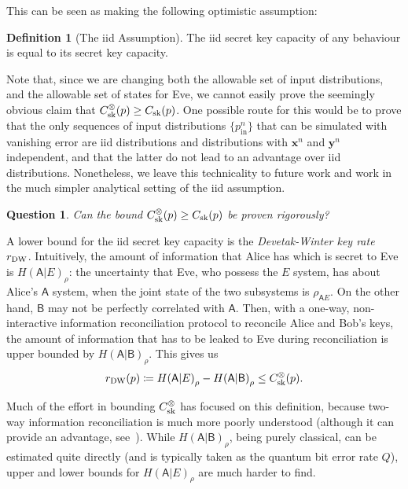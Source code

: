 \documentclass[10pt, a4paper]{article}
\numberwithin{equation}{section} %
\newcounter{stmt} %
\theoremstyle{definition}
\newtheorem{defn}[stmt]{Definition}
\theoremstyle{plain}
\newtheorem{question}{Question}
\newcommand{\?}{\mathrel{?}} %
\newcommand{\cvec}[1]{\boldsymbol{\mathbf{#1}}}    %
\newcommand{\crv}[1]{\mathsf{#1}}
\newcommand{\prin}[1][p]{#1_{\mathrm{in}}}
\newcommand{\sk}{\rm sk}
\newcommand{\DW}{\rm DW}
\begin{document}
    This can be seen as making the following optimistic assumption:
    \begin{defn}[The iid Assumption]
      The iid secret key capacity of any behaviour is equal to its secret key capacity.
    \end{defn}
    Note that, since we are changing both the allowable set of input distributions, and the allowable set of states for Eve, we cannot easily prove the seemingly obvious claim that \(C_{\sk}^{\otimes}(p) \geq C_{\sk}(p)\). One possible route for this would be to prove that the only sequences of input distributions \(\{\prin^n\}\) that can be simulated with vanishing error are iid distributions and distributions with \(\cvec{x}^n\) and \(\cvec{y}^n\) independent, and that the latter do not lead to an advantage over iid distributions. Nonetheless, we leave this technicality to future work and work in the much simpler analytical setting of the iid assumption.

    \begin{question}
      Can the bound \(C_{\sk}^{\otimes}(p) \geq C_{\sk}(p)\) be proven rigorously?
    \end{question}

    A lower bound for the iid secret key capacity is the \emph{Devetak-Winter key rate}~\cite{DevetakWinter} \(r_{\DW}\). Intuitively, the amount of information that Alice has which is secret to Eve is \({H(\crv{A}|E)}_{\rho}\): the uncertainty that Eve, who possess the \(E\) system, has about Alice's \(\crv{A}\) system, when the joint state of the two subsystems is \(\rho_{\crv{A}E}\).  On the other hand, \(\crv{B}\) may not be perfectly correlated with \(\crv{A}\). Then, with a one-way, non-interactive information reconciliation protocol to reconcile Alice and Bob's keys, the amount of information that has to be leaked to Eve during reconciliation is upper bounded by \({H(\crv{A}|\crv{B})}_{\rho}\). This gives us
    \begin{equation}
      r_{\DW}(p) \coloneqq {H(\crv{A}|E)}_{\rho} - {H(\crv{A}|\crv{B})}_{\rho} \leq C_{\sk}^{\otimes}(p).
    \end{equation}

    Much of the effort in bounding \(C_{\sk}^{\otimes}\) has focused on this definition, because two-way information reconciliation is much more poorly understood (although it can provide an advantage, see~\cite{AdvantageDistill}).  While \({H(\crv{A}|\crv{B})}_{\rho}\), being purely classical, can be estimated quite directly (and is typically taken as the quantum bit error rate \(Q\)), upper and lower bounds for \({H(\crv{A}|E)}_{\rho}\) are much harder to find.
\end{document}
